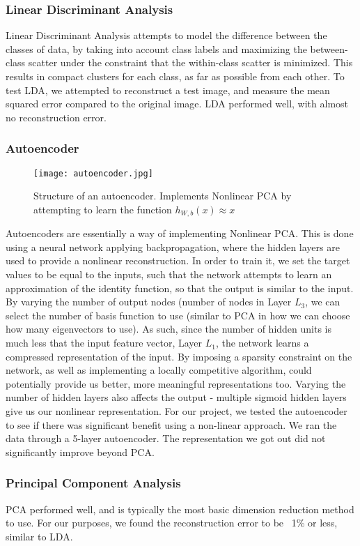 \subsubsection{Linear Discriminant Analysis}
Linear Discriminant Analysis attempts to model the difference between the classes of data, by taking into account class labels and maximizing the
between-class scatter under the constraint that the within-class scatter is minimized. This results in compact clusters for each class, as far as
possible from each other. To test LDA, we attempted to reconstruct a test image, and measure the mean squared error compared to the original image.
LDA performed well, with almost no reconstruction error.
\subsubsection{Autoencoder}
\begin{figure}[h]
		\texttt{[image: autoencoder.jpg]}\\
		\caption{Structure of an autoencoder. Implements Nonlinear PCA by attempting to learn the function $h_{W,b}(x) \approx x$}
		\label{fig:autoencoder}
\end{figure}
Autoencoders are essentially a way of implementing Nonlinear PCA. This is done using a neural network applying backpropagation, where the
hidden layers are used to provide a nonlinear reconstruction. In order to train it, we set the target values to be equal to the inputs, such
that the network attempts to learn an approximation of the identity function, so that the output is similar to the input. By varying the number 
of output nodes (number of nodes in Layer $L_3$,
we can select the number of basis function to use (similar to PCA in how we can choose how many eigenvectors to use). As such, since the number
of hidden units is much less that the input feature vector, Layer $L_1$, the network learns a compressed representation of the input. By imposing
a sparsity constraint on the network, as well as implementing a locally competitive algorithm, could potentially provide us better, more meaningful
representations too. Varying the number of hidden layers also affects the output - multiple sigmoid hidden layers give us our nonlinear representation.
For our project, we tested the autoencoder to see if there was significant benefit using a non-linear approach. We ran the data through a 5-layer 
autoencoder. The representation we got out did not significantly improve beyond PCA.

\subsubsection{Principal Component Analysis}
PCA performed well, and is typically the most basic dimension reduction method to use. For our purposes, we found the reconstruction error to be
~1\% or less, similar to LDA.\\

